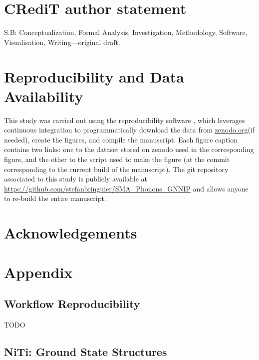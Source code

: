 \documentclass[preprint,colorlinks=true,linkcolor=black,citecolor=black]{elsarticle}
\begin{document}
 


\section*{CR\lowercase{e}d\lowercase{i}T author statement}

S.B: Conceptualization, Formal Analysis, Investigation, Methodology,
Software, Visualisation, Writing---original draft.


\section*{Reproducibility and Data Availability}
This study was carried out using the reproducibility software
\href{https://github.com/showyourwork/showyourwork}{\showyourwork}\cite{Luger2021},
which leverages continuous integration to programmatically download
the data from \href{https://zenodo.org/}{zenodo.org}(if needed),
create the figures, and compile the manuscript. Each figure caption
contains two links: one to the dataset stored on zenodo used in the
corresponding figure, and the other to the script used to make the
figure (at the commit corresponding to the current build of the
manuscript). The git repository associated to this study is publicly
available at
\url{https://github.com/stefanbringuier/SMA_Phonons_GNNIP} and allows
anyone to re-build the entire manuscript.\par

\section*{Acknowledgements}

\newpage
\appendix
\section{Appendix}
\subsection{Workflow Reproducibility}
\label{sec:appx_reproduce}

TODO

\subsection{NiTi: Ground State Structures}
\label{sec:opt_structures}

\end{document}
